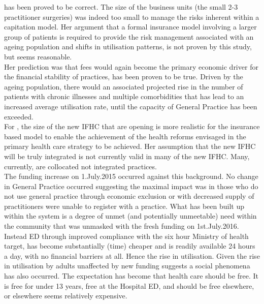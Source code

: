 \documentclass[11pt,a4paper]{article}
\begin{document}
\citet{howell2005restructuring} has been proved to be correct. The size of the business units (the small 2-3 practitioner surgeries) was indeed too small to manage the risks inherent within a capitation model\citep{howell2005restructuring}. Her argument that a formal insurance model involving a larger group of patients is required to provide the risk management associated with an ageing population and shifts in utilisation patterns, is not proven by this study, but seems reasonable. \\

Her prediction was that fees would again become the primary economic driver for the financial stability of practices, has been proven to be true\citep{howell2005restructuring}. Driven by the ageing  population, there would an associated projected rise in the number of patients with chronic illnesses and multiple comorbidities that has lead to an increased  average utilisation rate, until the capacity of General Practice has been exceeded. \\

For \citet{howell2005restructuring}, the size of the new IFHC that are opening is more realistic for the insurance based model to enable the achievement of the health reforms envisaged in the primary health care strategy to be achieved. Her assumption that the new IFHC will be truly integrated is not currently valid in many of the new IFHC. Many, currently, are collocated not integrated practices.\\

The funding increase on 1.July.2015 occurred against this background. No change in General Practice occurred suggesting the maximal impact was in those who do not use general practice through economic exclusion or with decreased supply of practitioners were unable to register with a practice. What has been built up within the system is a degree of unmet (and potentially unmeetable) need within the community that was unmasked with the fresh funding on 1st.July.2016.\\

Instead ED through improved compliance with the six hour Ministry of health target, has become substantially (time) cheaper and is readily available 24 hours a day, with no financial barriers at all. Hence the rise in utilisation. Given the rise in utilisation by adults unaffected by new funding suggests a social phenomena has also occurred. The expectation has become that health care should be free. It is free for under 13 years, free at the Hospital ED, and should be free elsewhere, or elsewhere seems relatively expensive. \\
\end{document}
